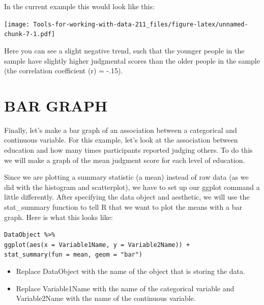\documentclass[
]{book}
\newenvironment{Shaded}{\begin{snugshade}}{\end{snugshade}}
\newcommand{\DataTypeTok}[1]{\textcolor[rgb]{0.13,0.29,0.53}{#1}}
\newcommand{\KeywordTok}[1]{\textcolor[rgb]{0.13,0.29,0.53}{\textbf{#1}}}
\newcommand{\NormalTok}[1]{#1}
\newcommand{\OperatorTok}[1]{\textcolor[rgb]{0.81,0.36,0.00}{\textbf{#1}}}
\newcommand{\StringTok}[1]{\textcolor[rgb]{0.31,0.60,0.02}{#1}}
\providecommand{\tightlist}{%
  \setlength{\itemsep}{0pt}\setlength{\parskip}{0pt}}
\begin{document}
In the current example this would look like this:

\begin{Shaded}
\end{Shaded}

\texttt{[image: Tools-for-working-with-data-211\_files/figure-latex/unnamed-chunk-7-1.pdf]}

Here you can see a slight negative trend, such that the younger people in the sample have slightly higher judgmental scores than the older people in the sample (the correlation coefficient (r) = -.15).

\hypertarget{bar-graph}{%
\section{BAR GRAPH}\label{bar-graph}}

Finally, let's make a bar graph of an association between a categorical and continuous variable. For this example, let's look at the association between education and how many times participants reported judging others. To do this we will make a graph of the mean judgment score for each level of education.

Since we are plotting a summary statistic (a mean) instead of raw data (as we did with the histogram and scatterplot), we have to set up our ggplot command a little differently. After specifying the data object and aesthetic, we will use the stat\_summary function to tell R that we want to plot the means with a bar graph. Here is what this looks like:

\texttt{DataObject\ \%\textgreater{}\%}\\
\texttt{ggplot(aes(x\ =\ Variable1Name,\ y\ =\ Variable2Name))\ +}~\\
\texttt{stat\_summary(fun\ =\ mean,\ geom\ =\ "bar")}

\begin{itemize}
\tightlist
\item
  Replace DataObject with the name of the object that is storing the data.
\item
  Replace Variable1Name with the name of the categorical variable and Variable2Name with the name of the continuous variable.
\end{itemize}
\end{document}
